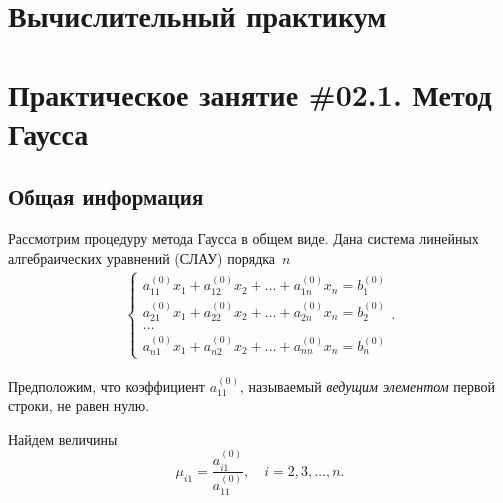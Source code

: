 \documentclass[12pt]{article}
\begin{document}
    \begin{flushright}
    \end{flushright}
    \begin{flushright}
	\end{flushright}
    \section*{Вычислительный практикум}
    \section*{Практическое занятие \#02.1. Метод Гаусса}

    \subsection*{Общая информация}

    Рассмотрим процедуру метода Гаусса в общем виде. Дана система линейных алгебраических уравнений (СЛАУ) порядка~$n$
    \begin{equation}
        \begin{gathered}
        	\begin{cases}
        		a_{11}^{\left(0\right)}x_1+a_{12}^{\left(0\right)}x_2+\ldots+a_{1n}^{\left(0\right)}x_n=b_{1}^{\left(0\right)}\\
        		a_{21}^{\left(0\right)}x_1+a_{22}^{\left(0\right)}x_2+\ldots+a_{2n}^{\left(0\right)}x_n=b_{2}^{\left(0\right)}\\
        		\ldots\\
        		a_{n1}^{\left(0\right)}x_1+a_{n2}^{\left(0\right)}x_2+\ldots+a_{nn}^{\left(0\right)}x_n=b_{n}^{\left(0\right)}
        	\end{cases}.
        \end{gathered}\label{7.1:f1}
    \end{equation}

    Предположим, что коэффициент $a_{11}^{\left(0\right)}$, называемый \emph{ведущим элементом} первой строки, не равен нулю.

    Найдем величины
    \begin{equation}
        \mu_{i1} = \frac{a^{\left(0\right)}_{i1}}{a^{\left(0\right)}_{11}},\quad i=2,3,\ldots, n.\label{7.1:f2}
    \end{equation}
    
\end{document}
